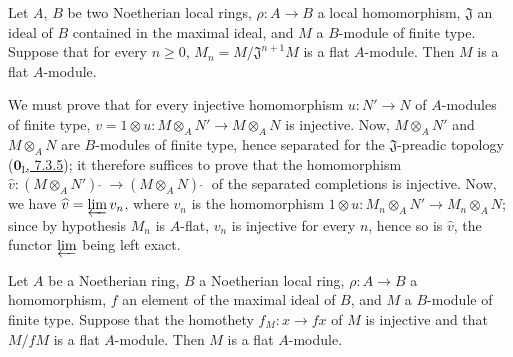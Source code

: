 \begin{proposition}[10.2.6]
\label{0.10.2.6}
Let $A$, $B$ be two Noetherian local rings, $\rho:A\to B$ a local
homomorphism, $\mathfrak{J}$ an ideal of $B$ contained in the maximal
ideal, and $M$ a $B$-module of finite type. Suppose that for every $n\geq0$,
$M_n=M/\mathfrak{J}^{n+1}M$ is a flat $A$-module. Then $M$ is a flat
$A$-module.
\end{proposition}

We must prove that for every injective homomorphism $u:N'\to N$ of
$A$-modules of finite type, $v=1\otimes u:M\otimes_A N'\to M\otimes_A N$ is
injective. Now, $M\otimes_A N'$ and $M\otimes_A N$ are $B$-modules of finite
type, hence separated for the $\mathfrak{J}$-preadic topology
(\hyperref[0.7.3.5]{$\mathbf{0}_{\mathrm I}$, 7.3.5}); it therefore suffices to prove that
the homomorphism
$\widehat v:(M\otimes_A N'){\,\widehat{\,}\,}\to(M\otimes_A N){\,\widehat{\,}\,}$ of the
separated completions is injective. Now, we have $\widehat v=\varprojlim v_n$, where
$v_n$ is the homomorphism $1\otimes u:M_n\otimes_A N'\to M_n\otimes_A N$;
since by hypothesis $M_n$ is $A$-flat, $v_n$ is injective for every $n$, hence
so is $\widehat v$, the functor $\varprojlim$ being left exact.

\begin{corollary}[10.2.7]
\label{0.10.2.7}
Let $A$ be a Noetherian ring, $B$ a Noetherian local ring,
$\rho:A\to B$ a homomorphism, $f$ an element of the maximal ideal of $B$, and $M$
a $B$-module of finite type. Suppose that the homothety
$f_M:x\to fx$ of $M$ is injective and that $M/fM$ is a flat
$A$-module. Then $M$ is a flat $A$-module.
\end{corollary}

